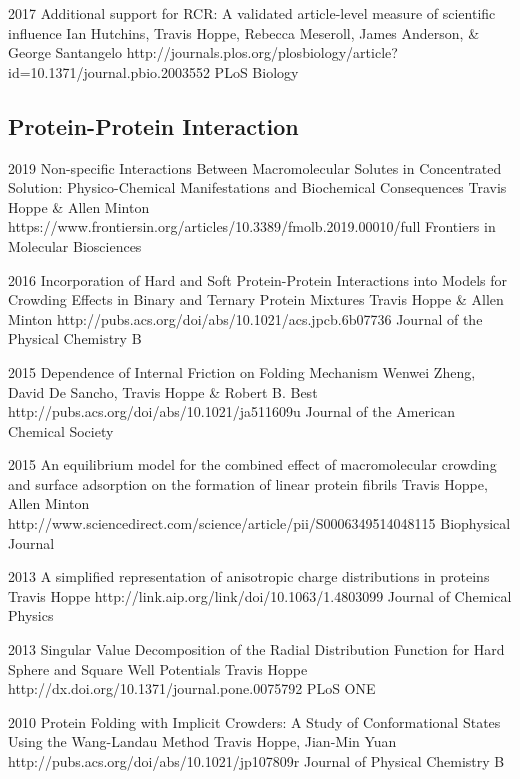 \documentclass[]{scrartcl}
\begin{document}
\begin{cleanCV}
\Paper
{2017}
{Additional support for RCR: A validated article-level measure of scientific influence}
{Ian Hutchins, Travis Hoppe, Rebecca Meseroll, James Anderson, \& George Santangelo}
{http://journals.plos.org/plosbiology/article?id=10.1371/journal.pbio.2003552}
{PLoS Biology}


\subsection{Protein-Protein Interaction}

\Paper
{2019}
{Non-specific Interactions Between Macromolecular Solutes in Concentrated Solution: Physico-Chemical Manifestations and Biochemical Consequences}
{Travis Hoppe \& Allen Minton}
{https://www.frontiersin.org/articles/10.3389/fmolb.2019.00010/full}
{Frontiers in Molecular Biosciences}


\Paper
{2016}
{Incorporation of Hard and Soft Protein-Protein Interactions into Models for Crowding Effects in Binary and Ternary Protein Mixtures}
{Travis Hoppe \& Allen Minton}
{http://pubs.acs.org/doi/abs/10.1021/acs.jpcb.6b07736}
{Journal of the Physical Chemistry B}

\Paper
{2015}
{Dependence of Internal Friction on Folding Mechanism}
{Wenwei Zheng, David De Sancho, Travis Hoppe \& Robert B. Best}
{http://pubs.acs.org/doi/abs/10.1021/ja511609u}
{Journal of the American Chemical Society}

\Paper
{2015}
{An equilibrium model for the combined effect of macromolecular crowding and surface adsorption on the formation of linear protein fibrils}
{Travis Hoppe, Allen Minton}
{http://www.sciencedirect.com/science/article/pii/S0006349514048115}
{Biophysical Journal}

\Paper
{2013}
{A simplified representation of anisotropic charge distributions in proteins}
{Travis Hoppe}
{http://link.aip.org/link/doi/10.1063/1.4803099}
{Journal of Chemical Physics}

\Paper
{2013}
{Singular Value Decomposition of the Radial Distribution Function 
for Hard Sphere and Square Well Potentials}
{Travis Hoppe}
{http://dx.doi.org/10.1371/journal.pone.0075792}
{PLoS ONE}


\Paper
{2010}
{Protein Folding with Implicit Crowders: 
  A Study of Conformational States Using the Wang-Landau Method}
{Travis Hoppe, Jian-Min Yuan}
{http://pubs.acs.org/doi/abs/10.1021/jp107809r}
{Journal of Physical Chemistry B}


\end{cleanCV}
\end{document}
